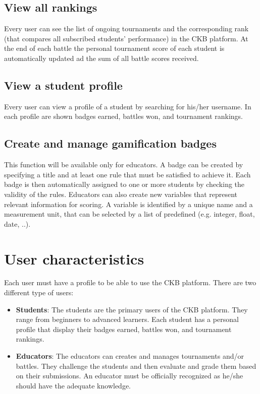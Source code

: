 \subsection{View all rankings}
Every user can see the list of ongoing tournaments and the corresponding rank (that compares all subscribed students' performance) in the CKB platform.
At the end of each battle the personal tournament score of each student is automatically updated ad the sum of all battle scores received. 

\subsection{View a student profile}
Every user can view a profile of a student by searching for his/her username. In each profile are shown badges earned, battles won, and tournament rankings. 

\subsection{Create and manage gamification badges}
This function will be available only for educators. 
\newline A badge can be created by specifying a title and at least one rule that must be satisfied to achieve it. Each badge is then automatically assigned to one or more students by checking the validity of the rules. Educators can also create new variables that represent relevant information for scoring. A variable is identified by a unique name and a measurement unit, that can be selected by a list of predefined (e.g. integer, float, date, ..).

\section{User characteristics}
Each user must have a profile to be able to use the CKB platform.
There are two different type of users:
\begin{itemize}
	\item \textbf{Students}:
	    The students are the primary users of the CKB platform. They range from beginners to advanced learners. Each student has a personal profile that display their badges earned, battles won, and tournament rankings. 
	\item \textbf{Educators}: 
		The educators can creates and manages tournaments and/or battles. They challenge the students and then evaluate and grade them based on their submissions. An educator must be officially recognized as he/she should have the adequate knowledge.
\end{itemize}

